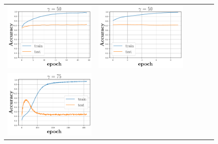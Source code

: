 \begin{figure}[h]
\begin{minipage}{0.99\columnwidth}
{\begin{tabular}{cccccc}
\includegraphics[scale=0.125]{figs/relu_50_good.pdf}&
\includegraphics[scale=0.125]{figs/galu_50_recovered.pdf}
\\
\includegraphics[scale=0.125]{figs/relu_75.pdf}&

\end{tabular}}
\end{minipage}
\end{figure}
